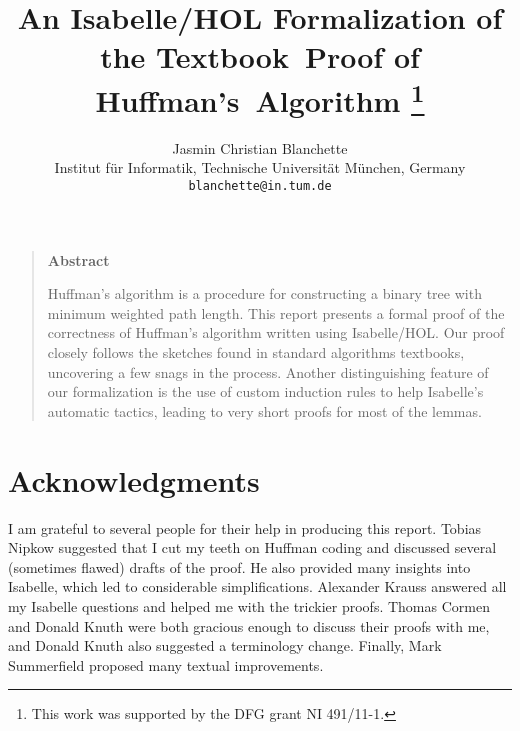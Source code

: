 \documentclass[11pt,a4paper]{article}
\begin{document}
\title{An Isabelle/HOL Formalization of the Textbook~Proof of
       Huffman's~Algorithm%
\thanks{This work was supported by the DFG grant NI 491/11-1.}}

\author{Jasmin Christian Blanchette \\ \small
Institut f\"ur Informatik, Technische Universit\"at M\"unchen, Germany \\[-.2ex] \small
\texttt{blanchette@in.tum.de}}

\maketitle

\begin{quote}
\begin{center}{\bf\large Abstract}\end{center}

\smallskip

Huffman's algorithm is a procedure for constructing a binary tree with minimum
weighted path length. This report presents a formal proof of the correctness of
Huffman's algorithm written using Isabelle/HOL. Our proof closely follows the
sketches found in standard algorithms textbooks, uncovering a few snags in the
process. Another distinguishing feature of our formalization is the use of
custom induction rules to help Isabelle's automatic tactics, leading to very
short proofs for most of the lemmas.
\end{quote}

\vskip0pt

\tableofcontents



\section*{Acknowledgments}

I am grateful to several people for their help in producing this report.
Tobias Nipkow suggested that I cut my teeth on Huffman coding and
discussed several (sometimes flawed) drafts of the proof. He also
provided many insights into Isabelle, which led to considerable
simplifications. Alexander Krauss answered all my Isabelle questions and
helped me with the trickier proofs. Thomas Cormen and Donald Knuth were
both gracious enough to discuss their proofs with me, and Donald Knuth
also suggested a terminology change. Finally, Mark Summerfield proposed
many textual improvements.
\end{document}

